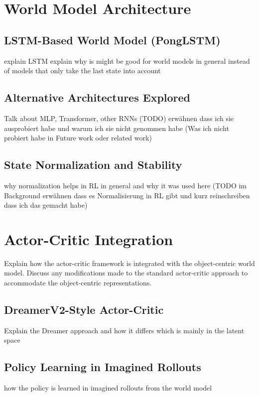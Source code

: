 \documentclass[
	english,
	ruledheaders=section,
	class=report,
	thesis={type=master},
	accentcolor=9c,
	custommargins=true,
	marginpar=false,
	parskip=half-,
	fontsize=11pt,
]{tudapub}
\begin{document}
\section{World Model Architecture}
\label{sec:world_model_arch}

\subsection{LSTM-Based World Model (PongLSTM)}
\label{subsec:ponglstm}
explain LSTM
explain why is might be good for world models in general instead of models that only take the last state into account

\subsection{Alternative Architectures Explored}
\label{subsec:alternative_architectures}
Talk about MLP, Transformer, other RNNs
(TODO) erwähnen dass ich sie ausprobiert habe und warum ich sie nicht genommen habe
(Was ich nicht probiert habe in Future work oder related work)

\subsection{State Normalization and Stability}
\label{subsec:normalization}
why normalization helps in RL in general and why it was used here
(TODO im Background erwähnen dass es Normalisierung in RL gibt und kurz reinschreiben dass ich das gemacht habe)

\section{Actor-Critic Integration}
\label{sec:actor_critic}
Explain how the actor-critic framework is integrated with the object-centric world model.
Discuss any modifications made to the standard actor-critic approach to accommodate the
object-centric representations.

\subsection{DreamerV2-Style Actor-Critic}
\label{subsec:dreamer_ac}
Explain the Dreamer approach and how it differs which is mainly in the latent space

\subsection{Policy Learning in Imagined Rollouts}
\label{subsec:imagined_rollouts}
how the policy is learned in imagined rollouts from the world model
\end{document}
